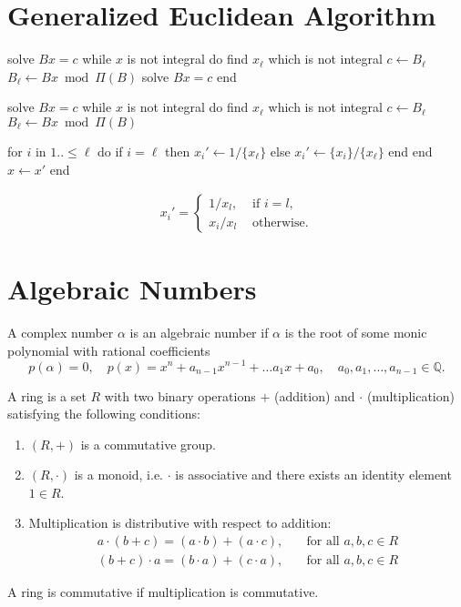\documentclass[english,version-2020-11]{uzl-thesis}
\newcommand\Q{{\mathbb Q}}
\begin{document}
\section{Generalized Euclidean Algorithm}

\begin{Pseudocode}
solve $Bx = c$
while $x$ is not integral do
  find $x_\ell$ which is not integral
  $c \gets B_\ell$
  $B_\ell \gets Bx \bmod Π(B)$
  solve $Bx = c$
end
\end{Pseudocode}

\begin{Pseudocode}
solve $Bx = c$
while $x$ is not integral do
  find $x_\ell$ which is not integral
  $c \gets B_\ell$
  $B_\ell \gets Bx \bmod Π(B)$

  for $i$ in $1..{\le} \ell$ do
    if $i = \ell$ then
      $x_i' \gets 1 / \{x_\ell\}$
    else
      $x_i' \gets \{x_i\} / \{x_\ell\}$
    end
  end
  $x \gets x'$
end
\end{Pseudocode}

\begin{align*}
  x_i' = \begin{cases}
    1 / x_l, & \text{ if } i = l, \\
    x_i / x_l & \text{ otherwise.}
  \end{cases}
\end{align*}

\section{Algebraic Numbers}

\begin{definition}
  A complex number $\alpha$ is an algebraic number if $\alpha$ is the root of some monic polynomial with rational coefficients
  \[
    p(\alpha) = 0, \quad p(x) = x^n + a_{n-1} x^{n-1} + \dots a_1 x + a_0, \quad a_0, a_1, \dots, a_{n-1} \in \Q.
  \]
\end{definition}

\begin{definition}[Ring]
  A ring is a set $R$ with two binary operations $+$ (addition) and $\cdot$ (multiplication)
  satisfying the following conditions:
  \begin{enumerate}
    \item $(R, +)$ is a commutative group.
    \item $(R, \cdot)$ is a monoid, i.e. $\cdot$ is associative and there exists an identity element $1 \in R$.
    \item Multiplication is distributive with respect to addition:
      \begin{align*}
        a \cdot (b + c) = (a \cdot b) + (a \cdot c), & \quad \text{for all } a, b, c \in R \\
        (b + c) \cdot a = (b \cdot a) + (c \cdot a), & \quad \text{for all } a, b, c \in R
      \end{align*}
  \end{enumerate}
  A ring is commutative if multiplication is commutative.
\end{definition}
\end{document}
